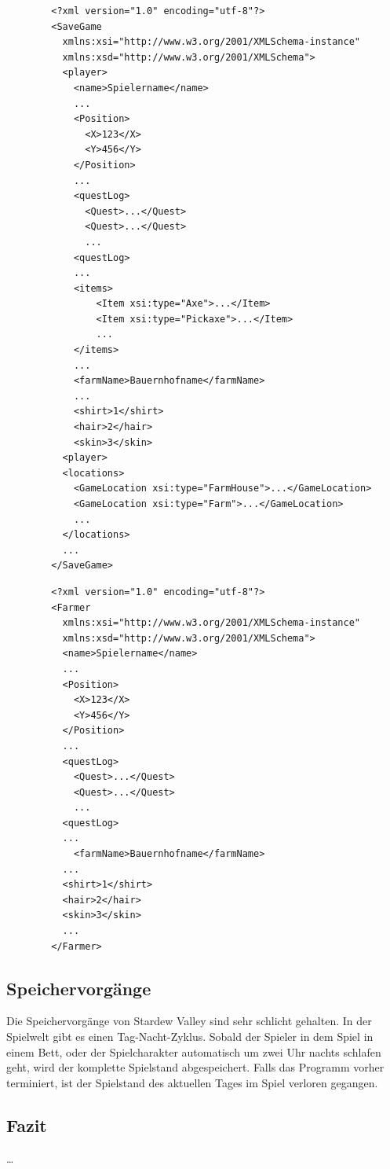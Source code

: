 \begin{listing}[htp]
    \begin{verbatim} 
        <?xml version="1.0" encoding="utf-8"?>
        <SaveGame
          xmlns:xsi="http://www.w3.org/2001/XMLSchema-instance"
          xmlns:xsd="http://www.w3.org/2001/XMLSchema">
          <player>
            <name>Spielername</name>
            ...
            <Position>
              <X>123</X>
              <Y>456</Y>
            </Position>
            ...
            <questLog>
              <Quest>...</Quest>
              <Quest>...</Quest>
              ...
            <questLog>
            ...
            <items>
                <Item xsi:type="Axe">...</Item>
                <Item xsi:type="Pickaxe">...</Item>
                ...
            </items>
            ...
            <farmName>Bauernhofname</farmName>
            ...
            <shirt>1</shirt>
            <hair>2</hair>
            <skin>3</skin>
          <player>
          <locations>
            <GameLocation xsi:type="FarmHouse">...</GameLocation>
            <GameLocation xsi:type="Farm">...</GameLocation>
            ...
          </locations>
          ...
        </SaveGame>
    \end{verbatim}
    \caption{Hauptdatei zum Speichern des Spielstandes}
    \label{lst:stardewvalleySaveGame}
\end{listing}

\begin{listing}[htp]
    \begin{verbatim} 
        <?xml version="1.0" encoding="utf-8"?>
        <Farmer
          xmlns:xsi="http://www.w3.org/2001/XMLSchema-instance"
          xmlns:xsd="http://www.w3.org/2001/XMLSchema">
          <name>Spielername</name>
          ...
          <Position>
            <X>123</X>
            <Y>456</Y>
          </Position>
          ...
          <questLog>
            <Quest>...</Quest>
            <Quest>...</Quest>
            ...
          <questLog>
          ...
            <farmName>Bauernhofname</farmName>
          ...
          <shirt>1</shirt>
          <hair>2</hair>
          <skin>3</skin>
          ...
        </Farmer>
    \end{verbatim}
    \caption{SaveGameInfo Datei}
    \label{lst:stardewvalleySaveGameInfo}
\end{listing}

\subsection{Speichervorgänge}
Die Speichervorgänge von Stardew Valley sind sehr schlicht gehalten. In der Spielwelt gibt es einen Tag-Nacht-Zyklus. Sobald der Spieler in dem Spiel in einem Bett, oder der Spielcharakter automatisch um zwei Uhr nachts schlafen geht, wird der komplette Spielstand abgespeichert. Falls das Programm vorher terminiert, ist der Spielstand des aktuellen Tages im Spiel verloren gegangen.\cite{stardewvalleywikiSaves}

\subsection{Fazit}
\dots
